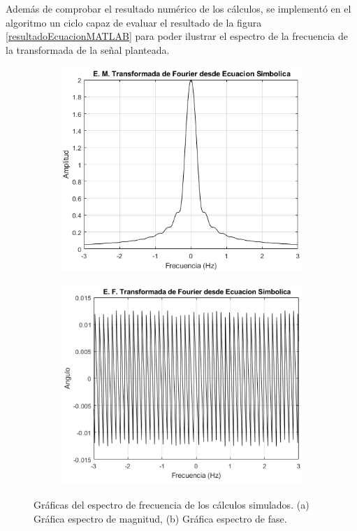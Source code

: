 \documentclass[11pt,letterpaper,twocolumn]{article}
\begin{document}
    Además de comprobar el resultado numérico de los cálculos, se implementó en el algoritmo un
    ciclo capaz de evaluar el resultado de la figura \ref{resultadoEcuacionMATLAB} para poder 
    ilustrar el espectro de la frecuencia de la transformada de la señal planteada.
     
    \begin{figure}[h]
        \centering 
        \begin{subfigure}[h]{0.49\linewidth}
            \includegraphics[width=\linewidth]{img/EMagnitudTF_ESimbolica.png}
            \caption{}
            \label{magnitudTeorica}
        \end{subfigure}
        \begin{subfigure}[h]{0.49\linewidth}
            \includegraphics[width=\linewidth]{img/EFaseTF_ESimbolica.png}
            \caption{}
            \label{faseTorica}
        \end{subfigure}
        \caption{Gráficas del espectro de frecuencia de los cálculos simulados. (a) Gráfica 
                espectro de magnitud, (b) Gráfica espectro de fase.}
        \label{espectroTeorico}
    \end{figure} 
\end{document}
